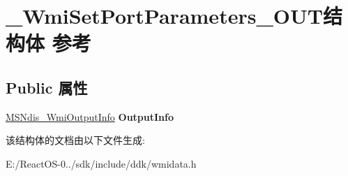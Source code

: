 \hypertarget{struct___wmi_set_port_parameters___o_u_t}{}\section{\+\_\+\+Wmi\+Set\+Port\+Parameters\+\_\+\+O\+U\+T结构体 参考}
\label{struct___wmi_set_port_parameters___o_u_t}
\subsection*{Public 属性}
\begin{DoxyCompactItemize}
\item 
\mbox{\label{struct___wmi_set_port_parameters___o_u_t_acabf05a309ade06843ca670a5b4d3080}} 
\hyperlink{struct___m_s_ndis___wmi_output_info}{M\+S\+Ndis\+\_\+\+Wmi\+Output\+Info} {\bfseries Output\+Info}
\end{DoxyCompactItemize}


该结构体的文档由以下文件生成\+:\begin{DoxyCompactItemize}
\item 
E\+:/\+React\+O\+S-\/0../sdk/include/ddk/wmidata.\+h\end{DoxyCompactItemize}
